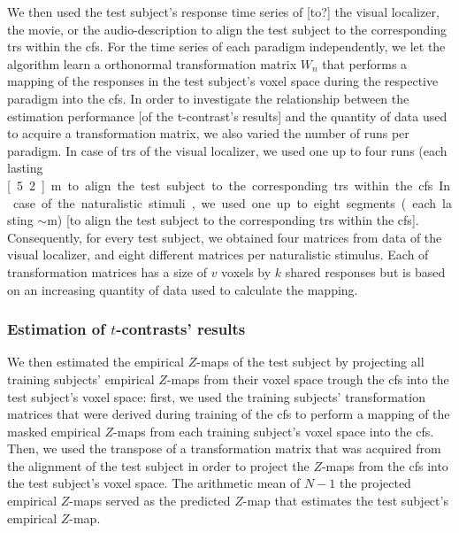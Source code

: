 %
We then used the test subject's response time series of [to?] the visual
localizer, the movie, or the audio-description to align the test subject to the
corresponding \acp{tr} within the \ac{cfs}.
%
For the time series of each paradigm independently, we let the algorithm learn a
orthonormal transformation matrix $W_{n}$ that performs a mapping of the
responses in the test subject's voxel space during the respective paradigm into
the \ac{cfs}.
%
In order to investigate the relationship between the estimation performance [of
the t-contrast's results] and the quantity of data used to acquire a
transformation matrix, we also varied the number of runs per paradigm.
%
In case of \acp{tr} of the visual localizer, we used one up to four runs (each
lasting \unit[5.2]{m} to align the test subject to the corresponding \acp{tr}
within the \ac{cfs}.
%
In case of the naturalistic stimuli, we used one up to eight segments (each
lasting $\sim$\unit[15]{m}) [to align the test subject to the corresponding
\acp{tr} within the \ac{cfs}].
%
Consequently, for every test subject, we obtained four matrices from data of the
visual localizer, and eight different matrices per naturalistic stimulus.
%
Each of transformation matrices has a size of $v$ voxels by $k$ shared responses
but is based on an increasing quantity of data used to calculate the mapping.


\subsubsection{Estimation of $t$-contrasts' results}

We then estimated the empirical $Z$-maps of the test subject by projecting all
training subjects' empirical $Z$-maps from their voxel space trough the \ac{cfs}
into the test subject's voxel space:
first, we used the training subjects' transformation matrices that were derived
during training of the \ac{cfs} to perform a mapping of the masked empirical
$Z$-maps from each training subject's voxel space into the \ac{cfs}.
Then, we used the transpose of a transformation matrix that was acquired from
the alignment of the test subject in order to project the $Z$-maps from the
\ac{cfs} into the test subject's voxel space.
The arithmetic mean of $N-1$ the projected empirical $Z$-maps served as the
predicted $Z$-map that estimates the test subject's empirical $Z$-map.



